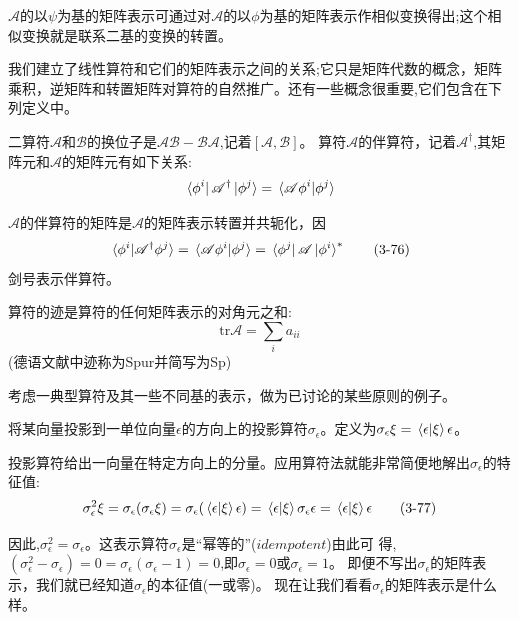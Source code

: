 \begin{theorem}
    $\mathscr{A}$的以$\psi$为基的矩阵表示可通过对$\mathscr{A}$的以$\phi$为基的矩阵表示作相似变换得出;这个相似变换就是联系二基的变换的转置。
\end{theorem}

我们建立了线性算符和它们的矩阵表示之间的关系;它只是矩阵代数的概念，矩阵乘积，逆矩阵和转置矩阵对算符的自然推广。还有一些概念很重要,它们包含在下列定义中。

\begin{definition}
    二算符$\mathscr{A}$和$\mathscr{B}$的换位子是$\mathscr{A}\mathscr{B}-\mathscr{B}\mathscr{A}$,记着$[\mathscr{A},\mathscr{B}]$。
    算符$\mathscr{A}$的伴算符，记着$\mathscr{A}^{\dagger}$,其矩阵元和$\mathscr{A}$的矩阵元有如下关系:
    \[\bra*{\phi^i}\mathscr{A}^{\dagger}\ket*{\phi^j}=\bra*{\mathscr{A}\phi^i}\ket*{\phi^j}\]    
\end{definition}

$\mathscr{A}$的伴算符的矩阵是$\mathscr{A}$的矩阵表示转置并共轭化，因
\[\bra*{\phi^i}\ket*{\mathscr{A}^{\dagger}\phi^j}=\bra*{\mathscr{A}\phi^i}\ket*{\phi^j}=\bra*{\phi^j}\mathscr{A}\ket*{\phi^i}^* \tag{3-76}\]
剑号表示伴算符。

\begin{definition}[迹]
    算符的迹是算符的任何矩阵表示的对角元之和:
    \[\text{tr}\mathscr{A}=\sum_ia_{ii}\]
    (德语文献中迹称为Spur并简写为Sp)
\end{definition}

考虑一典型算符及其一些不同基的表示，做为已讨论的某些原则的例子。

\begin{definition}[投影算符]
    将某向量投影到一单位向量$\epsilon$的方向上的投影算符$\sigma_{\epsilon}$。定义为$\sigma_{\epsilon}\xi=\bra*{\epsilon}\ket*{\xi}\epsilon$。
\end{definition}

投影算符给出一向量在特定方向上的分量。应用算符法就能非常简便地解出$\sigma_{\epsilon}$的特征值:
\[\sigma_{\epsilon}^2\xi=\sigma_{\epsilon}(\sigma_{\epsilon}\xi)=\sigma_{\epsilon}(\bra*{\epsilon}\ket*{\xi}\epsilon)=\bra*{\epsilon}\ket*{\xi}\sigma_{\epsilon}\epsilon=\bra*{\epsilon}\ket*{\xi}\epsilon \tag{3-77}\]

因此,$\sigma_{\epsilon}^2=\sigma_{\epsilon}$。这表示算符$\sigma_{\epsilon}$是“幂等的”($idempotent$)由此可
得,$(\sigma_{\epsilon}^2-\sigma_{\epsilon})=0=\sigma_{\epsilon}(\sigma_{\epsilon}-1)=0$,即$\sigma_{\epsilon}=0$或$\sigma_{\epsilon}=1$。
即便不写出$\sigma_{\epsilon}$的矩阵表示，我们就已经知道$\sigma_{\epsilon}$的本征值(一或零)。
现在让我们看看$\sigma_{\epsilon}$的矩阵表示是什么样。

